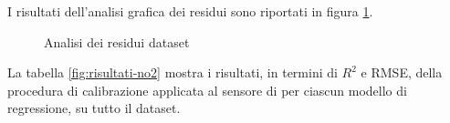 I risultati dell'analisi grafica dei residui sono riportati in figura \ref{fig:residui_no2}.

\begin{figure}[H]
\centering
{}\hfil
{}

\hfil
{}
\caption{Analisi dei residui dataset }
\label{fig:residui_no2}
\end{figure}

La tabella \ref{fig:risultati-no2} mostra i risultati, in termini di $R^2$ e RMSE, della procedura di calibrazione applicata al sensore di  per ciascun modello di regressione, su tutto il dataset.

